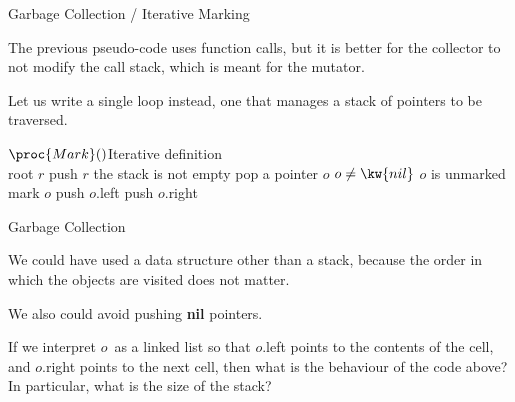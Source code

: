 \documentclass[compress,dvipdfmx]{beamer}
\begin{document}





%
\begin{frame}{Garbage Collection / Iterative Marking}

  The previous pseudo\hyp{}code uses function calls, but it is better
  for the collector to not modify the call stack, which is meant for
  the mutator.

  \bigskip

  Let us write a single loop instead, one that manages a stack of
  pointers to be traversed.
  \begin{codebox}
    \(\proc{Mark}()\)\RComment Iterative definition \\
    \li \For {} root \(r\)  push \(r\)
    \li \While the stack is not empty 
    \li \> pop a pointer \(o\)
    \li \>  \If \(o \neq \kw{nil}\)  \(o\) is unmarked
    \li     \Then mark \(o\)
    \li           push \(o\).left
    \li          push \(o\).right
            \End
  \end{codebox}

\end{frame}

%
\begin{frame}{Garbage Collection}

  We could have used a data structure other than a stack, because the
  order in which the objects are visited does not matter.

  \bigskip

  We also could avoid pushing \textbf{nil} pointers.

  \bigskip

  If we interpret \(o\)~as a linked list so that \(o\).left points to
  the contents of the cell, and \(o\).right points to the next cell,
  then what is the behaviour of the code above? In particular, what is
  the size of the stack?

\end{frame}
\end{document}
